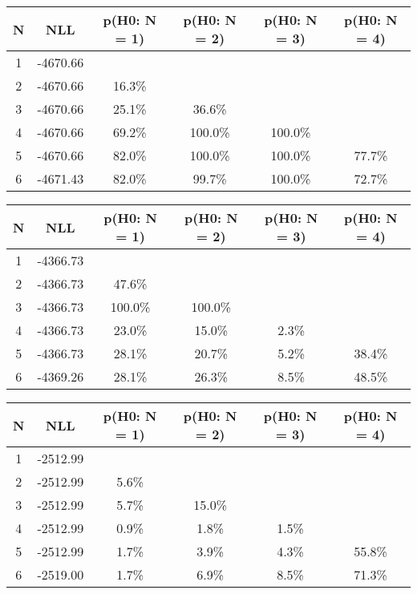 \begin{table}[h!]
	\centering
	\begin{tabular}{cc||cccc}
		N & NLL & p(H0: N = 1) & p(H0: N = 2) & p(H0: N = 3) & p(H0: N = 4)\\ 
		\hline
1 & -4670.66 & & & & \\
2 & -4670.66 & 16.3\% & & & \\
3 & -4670.66 & 25.1\% & 36.6\% & & \\
4 & -4670.66 & 69.2\% & 100.0\% & 100.0\% & \\
5 & -4670.66 & 82.0\% & 100.0\% & 100.0\% & 77.7\% \\
6 & -4671.43 & 82.0\% & 99.7\% & 100.0\% & 72.7\% \\
	\end{tabular}
	\label{tab:lab}
\end{table}

\begin{table}[h!]
	\centering
	\begin{tabular}{cc||cccc}
		N & NLL & p(H0: N = 1) & p(H0: N = 2) & p(H0: N = 3) & p(H0: N = 4)\\ 
		\hline
1 & -4366.73 & & & & \\
2 & -4366.73 & 47.6\% & & & \\
3 & -4366.73 & 100.0\% & 100.0\% & & \\
4 & -4366.73 & 23.0\% & 15.0\% & 2.3\% & \\
5 & -4366.73 & 28.1\% & 20.7\% & 5.2\% & 38.4\% \\
6 & -4369.26 & 28.1\% & 26.3\% & 8.5\% & 48.5\% \\
	\end{tabular}
	\label{tab:lab}
\end{table}

\begin{table}[h!]
	\centering
	\begin{tabular}{cc||cccc}
		N & NLL & p(H0: N = 1) & p(H0: N = 2) & p(H0: N = 3) & p(H0: N = 4)\\ 
		\hline
1 & -2512.99 & & & & \\
2 & -2512.99 & 5.6\% & & & \\
3 & -2512.99 & 5.7\% & 15.0\% & & \\
4 & -2512.99 & 0.9\% & 1.8\% & 1.5\% & \\
5 & -2512.99 & 1.7\% & 3.9\% & 4.3\% & 55.8\% \\
6 & -2519.00 & 1.7\% & 6.9\% & 8.5\% & 71.3\% \\
	\end{tabular}
	\label{tab:lab}
\end{table}

